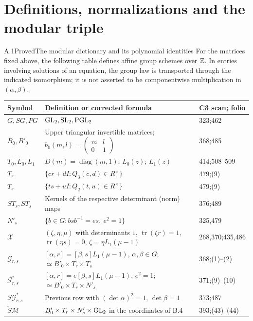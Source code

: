 \section{Definitions, normalizations and the modular triple}

\begin{statement}{A.1}{Proved}{The modular dictionary and its polynomial identities}
For the matrices fixed above, the following table defines affine group
schemes over $\mathbb Z$. In entries involving solutions of an equation, the
group law is transported through the indicated isomorphism; it is not
asserted to be componentwise multiplication in $(\alpha,\beta)$.
\end{statement}
\begin{longtable}{p{.16\linewidth}p{.56\linewidth}p{.18\linewidth}}
\toprule Symbol&Definition or corrected formula&C3 scan; folio\\\midrule\endhead
$G,SG,PG$&$\operatorname{GL}_2,\operatorname{SL}_2,\operatorname{PGL}_2$&323;462\\
$B_0,B'_0$&Upper triangular invertible matrices;
 $b_0(m,l)=\left(\begin{smallmatrix}m&l\\0&1\end{smallmatrix}\right)$&368;485\\
$T_0,L_0,L_1$&$D(m)=\operatorname{diag}(m,1)$; $L_0(z)$; $L_1(z)$&414;508--509\\
$T_r$&$\{cr+dI:Q_3(c,d)\in R^\times\}$&479;(9)\\
$T_s$&$\{ts+uI:Q_2(t,u)\in R^\times\}$&479;(9)\\
$ST_r,ST_s$&Kernels of the respective determinant (norm) maps&376;489\\
$N'_s$&$\{b\in G:b s b^{-1}=e s,\ e^2=1\}$&325,479\\
$\mathcal X$&$(\zeta,\eta,\mu)$ with determinants $1$,
 $\operatorname{tr}(\zeta r)=1$, $\operatorname{tr}(\eta s)=0$,
 $\zeta=\eta L_1(\mu-1)$&268,370;435,486\\
$\mathcal G_{r,s}$&$[\alpha,r]=[\beta,s]L_1(\mu-1)$,
 $\alpha,\beta\in G$; $\simeq B'_0\times T_r\times T_s$&368;(1)--(2)\\
$\mathcal G^*_{r,s}$&$[\alpha,r]=e[\beta,s]L_1(\mu-1)$,
 $e^2=1$; $\simeq B'_0\times T_r\times N'_s$&371;(9)--(10)\\
$S\mathcal G^*_{r,s}$&Previous row with $(\det\alpha)^2=1$, $\det\beta=1$&373;487\\
$\widetilde S\mathcal M$&$B'_0\times T_r\times N'_s\times\operatorname{GL}_2$ in the coordinates of B.4&393;(43)--(44)\\

\end{longtable}
